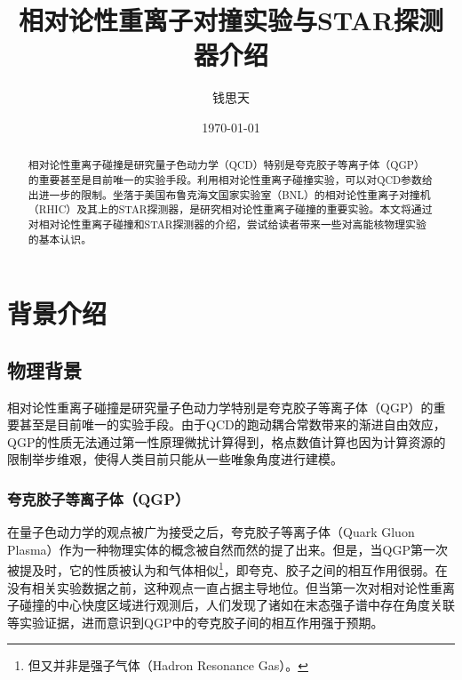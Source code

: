 \documentclass[%
 reprint,
 amsmath,amssymb,
 aps,
]{revtex4-1}
\begin{document}

\title{相对论性重离子对撞实验与STAR探测器介绍}%
\author{钱思天}
%


\date{\today}%

\begin{abstract}
相对论性重离子碰撞是研究量子色动力学（QCD）特别是夸克胶子等离子体（QGP）的重要甚至是目前唯一的实验手段。利用相对论性重离子碰撞实验，可以对QCD参数给出进一步的限制。坐落于美国布鲁克海文国家实验室（BNL）的相对论性重离子对撞机（RHIC）及其上的STAR探测器，是研究相对论性重离子碰撞的重要实验。本文将通过对相对论性重离子碰撞和STAR探测器的介绍，尝试给读者带来一些对高能核物理实验的基本认识。
\end{abstract}

\maketitle


\section{\label{sec:bgd}背景介绍}



\subsection{\label{sec:Phybg}物理背景}

相对论性重离子碰撞是研究量子色动力学特别是夸克胶子等离子体（QGP）的重要甚至是目前唯一的实验手段。由于QCD的跑动耦合常数带来的渐进自由效应，QGP的性质无法通过第一性原理微扰计算得到，格点数值计算也因为计算资源的限制举步维艰，使得人类目前只能从一些唯象角度进行建模。
\subsubsection{\label{sec:QGP}夸克胶子等离子体（QGP）}
在量子色动力学的观点被广为接受之后，夸克胶子等离子体（Quark Gluon Plasma）作为一种物理实体的概念被自然而然的提了出来。但是，当QGP第一次被提及时，它的性质被认为和气体相似\footnote{但又并非是强子气体（Hadron Resonance Gas）。}，即夸克、胶子之间的相互作用很弱。在没有相关实验数据之前，这种观点一直占据主导地位。但当第一次对相对论性重离子碰撞的中心快度区域进行观测后，人们发现了诸如在末态强子谱中存在角度关联等实验证据，进而意识到QGP中的夸克胶子间的相互作用强于预期。
\end{document}
